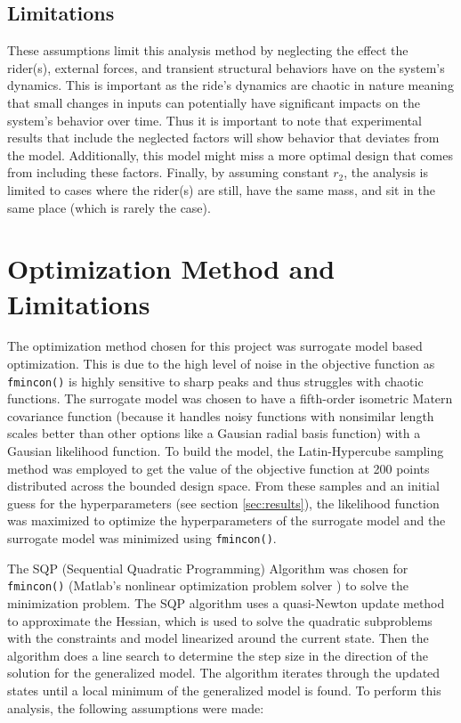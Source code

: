 \documentclass[11pt]{article}%
\begin{document}
\subsection{Limitations}

These assumptions limit this analysis method by neglecting the effect the rider(s), external forces, and transient structural behaviors have on the system's dynamics. This is important as the ride's dynamics are chaotic in nature meaning that small changes in inputs can potentially have significant impacts on the system's behavior over time. Thus it is important to note that experimental results that include the neglected factors will show behavior that deviates from the model. Additionally, this model might miss a more optimal design that comes from including these factors. Finally, by assuming constant $r_{2}$, the analysis is limited to cases where the rider(s) are still, have the same mass, and sit in the same place (which is rarely the case).

\section{Optimization Method and Limitations}
\label{sec:optimizationmethod}

The optimization method chosen for this project was surrogate model based optimization. This is due to the high level of noise in the objective function as \lstinline{fmincon()} is highly sensitive to sharp peaks and thus struggles with chaotic functions. The surrogate model was chosen to have a fifth-order isometric Matern covariance function (because it handles noisy functions with nonsimilar length scales better than other options like a Gausian radial basis function) with a Gausian likelihood function. To build the model, the Latin-Hypercube sampling method was employed to get the value of the objective function at 200 points distributed across the bounded design space. From these samples and an initial guess for the hyperparameters (see section \ref{sec:results}), the likelihood function was maximized to optimize the hyperparameters of the surrogate model and the surrogate model was minimized using \lstinline{fmincon()}.

The SQP (Sequential Quadratic Programming) Algorithm was chosen for \lstinline{fmincon()} (Matlab's nonlinear optimization problem solver \cite{matlab}) to solve the minimization problem. The SQP algorithm uses a quasi-Newton update method to approximate the Hessian, which is used to solve the quadratic subproblems with the constraints and model linearized around the current state. Then the algorithm does a line search to determine the step size in the direction of the solution for the generalized model. The algorithm iterates through the updated states until a local minimum of the generalized model is found. To perform this analysis, the following assumptions were made:
\end{document}
